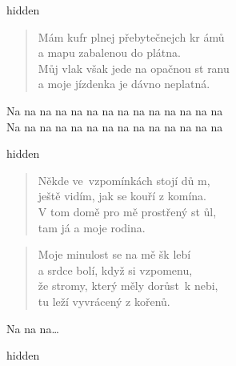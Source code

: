 \begin{song}{}
\begin{optional}{hidden}
\end{optional}
\begin{verse}
   Mám kufr plnej přebytečnejch kr ámů \\
   a mapu zabalenou do plátna.  \\
   Můj vlak však jede na opačnou st ranu \\
   a moje jízdenka je dávno neplatná.
\end{verse}
\begin{deco}
   Na na na na na na na na na na na na na na \\
   Na na na na na na na na na na na na na na
\end{deco}
\begin{optional}{hidden}
  
\end{optional}
\begin{verse}
   Někde ve~vzpomínkách stojí dů m, \\
   ještě vidím, jak se kouří z komína.  \\
   V tom domě pro mě prostřený st ůl, \\
   tam já a moje rodina. 
\end{verse}
\begin{verse}
   Moje minulost se na mě šk lebí \\
   a srdce bolí, když si vzpomenu,  \\
   že stromy, který měly dorůst~k nebi, \\
   tu leží vyvrácený z kořenů. 
\end{verse}
\begin{deco}
   Na na na\ldots
\end{deco}

\begin{optional}{hidden}
  
\end{optional}



\end{song}
